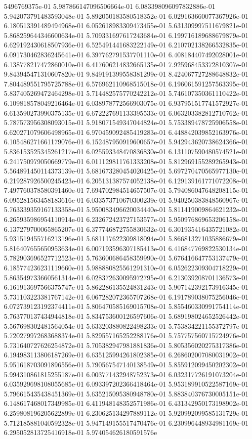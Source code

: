 5496769375e-01	5.987866147096506664e-01	6.083398096097832886e-01	5.942073791483593048e-01	5.892050183580518352e-01	6.029163660077367926e-01	6.180513391489494968e-01	6.052618983309473455e-01	5.631309997511679821e-01	5.868259644346600634e-01	5.709331697617243684e-01	6.199716189688679879e-01	6.629192430618507936e-01	6.525491441683222149e-01	6.210702138266532835e-01	6.091730462836245641e-01	6.397762791537701110e-01	6.408184407492028001e-01	6.138778217472860010e-01	6.417606214832665135e-01	7.925968453372810307e-01	9.843945471310607820e-01	9.849191399558381299e-01	8.424067727288648832e-01	7.804489551795725788e-01	6.576962110968515018e-01	6.196061591257563395e-01	5.837405269472464298e-01	5.714482575770242212e-01	5.746107350361110422e-01	6.109818578049216464e-01	6.038978772566903075e-01	6.937951517741572927e-01	6.613590273990375135e-01	6.672227691133395533e-01	6.063203382812710762e-01	5.787573956308093015e-01	5.918071549347044824e-01	5.753389478725906558e-01	6.620271079606498965e-01	6.970459092485419283e-01	6.448842039852163976e-01	6.105486271661179076e-01	6.152487950919600657e-01	5.942943620738624366e-01	5.836153525345261217e-01	6.025593348470836830e-01	6.131107590480574521e-01	6.241750979050669779e-01	6.011129811761333208e-01	5.812969155289265943e-01	5.564891450114373139e-01	5.681673280454020425e-01	5.697270470565977130e-01	6.219287926500245423e-01	6.205131387574052138e-01	6.129139161771072208e-01	7.497760378580391460e-01	7.694702984514657507e-01	5.794086047648208115e-01	6.095281563458183616e-01	6.033573710670300239e-01	5.940250383848560967e-01	5.763339359167133358e-01	5.950083496620034440e-01	5.811419009864621232e-01	6.265935986954110914e-01	6.232672423727153577e-01	5.950976869653206158e-01	6.137279700065865207e-01	6.377746872755830632e-01	6.301935416435721082e-01	5.931519455716213196e-01	5.681117622309818094e-01	5.866813271035886679e-01	5.816407655650953634e-01	6.007193596307185413e-01	6.416847769822530134e-01	5.782903696527712523e-01	5.763600686458359990e-01	5.676416647753137479e-01	6.185774236231119660e-01	5.988880825561291310e-01	6.052622309304718229e-01	5.863549733660561314e-01	6.028372630095972795e-01	6.213039208701136573e-01	6.161913697566375747e-01	5.862286135524831243e-01	5.907142392173916345e-01	5.731103223381767142e-01	6.067282072365707268e-01	6.191789038075256046e-01	6.072739123192374411e-01	5.806470585169015708e-01	5.855460330991754114e-01	5.763770137434944818e-01	5.834753600126597606e-01	5.689198024652526442e-01	5.567698302481564054e-01	5.633203880822498233e-01	5.753834221155372797e-01	5.720279972683688374e-01	5.829557165252288176e-01	5.757757560715724976e-01	5.731640727626254872e-01	5.705382947981881836e-01	5.805356020275317386e-01	6.194983113806187269e-01	6.635125994261802385e-01	6.268602007080031902e-01	5.951618703091896556e-01	5.790567547140138549e-01	5.855912099450202302e-01	5.994310861815255187e-01	6.003771432948752373e-01	6.032317726191073204e-01	6.035929698108055685e-01	6.093397202366418464e-01	5.953189910522587169e-01	5.796615435438451369e-01	5.635215095380948780e-01	5.883840376730005151e-01	6.148617468017349985e-01	6.411948148352571986e-01	6.431342950173198902e-01	6.259808196205622899e-01	6.230625134297889112e-01	5.920992099585131729e-01	5.712185881040592328e-01	5.947149155517470476e-01	6.230996448934981169e-01	6.295052813725416918e-01	5.974054626180591576e